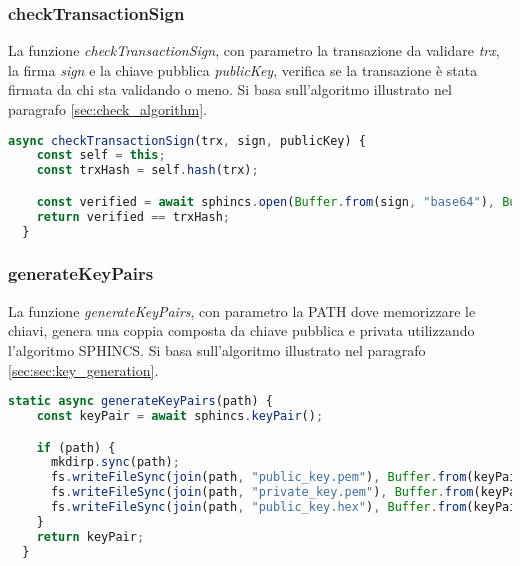 \subsubsection{checkTransactionSign}
La funzione \textit{checkTransactionSign}, con parametro la transazione da validare \textit{trx}, la firma \textit{sign} e la chiave pubblica \textit{publicKey}, verifica se la transazione è stata firmata da chi sta validando o meno. Si basa sull'algoritmo illustrato nel paragrafo \ref{sec:check_algorithm}.
\\
\begin{lstlisting}[language=JavaScript,breaklines]
  async checkTransactionSign(trx, sign, publicKey) {
    const self = this;
    const trxHash = self.hash(trx);

    const verified = await sphincs.open(Buffer.from(sign, "base64"), Buffer.from(publicKey, 'hex'));
    return verified == trxHash;
  }
\end{lstlisting}

\subsubsection{generateKeyPairs}
La funzione \textit{generateKeyPairs}, con parametro la PATH dove memorizzare le chiavi, genera una coppia composta da chiave pubblica e privata utilizzando l'algoritmo SPHINCS. Si basa sull'algoritmo illustrato nel paragrafo \ref{sec:sec:key_generation}.
\\
\begin{lstlisting}[language=JavaScript,breaklines]
  static async generateKeyPairs(path) {
    const keyPair = await sphincs.keyPair();

    if (path) {
      mkdirp.sync(path);
      fs.writeFileSync(join(path, "public_key.pem"), Buffer.from(keyPair.publicKey).toString('hex'));
      fs.writeFileSync(join(path, "private_key.pem"), Buffer.from(keyPair.privateKey).toString('hex'));
      fs.writeFileSync(join(path, "public_key.hex"), Buffer.from(keyPair.publicKey).toString('hex'));
    }
    return keyPair;
  }
\end{lstlisting}


